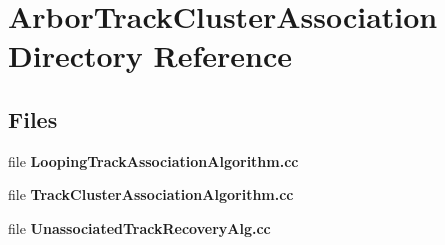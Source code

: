 \section{Arbor\+Track\+Cluster\+Association Directory Reference}
\label{dir_a32fcd465bd0b2ae3439dd16299fc939}
\subsection*{Files}
\begin{DoxyCompactItemize}
\item 
file {\bf Looping\+Track\+Association\+Algorithm.\+cc}
\item 
file {\bf Track\+Cluster\+Association\+Algorithm.\+cc}
\item 
file {\bf Unassociated\+Track\+Recovery\+Alg.\+cc}
\end{DoxyCompactItemize}
